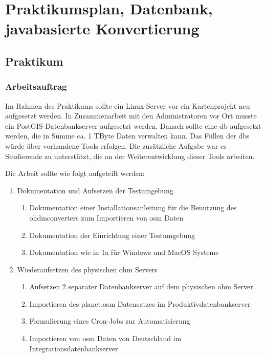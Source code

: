  \chead{} \ohead{\headmark}
\ifoot{\printTitle}  \ofoot{}
\part{Praktikumsplan, Datenbank, javabasierte Konvertierung}
\chapter{Praktikum}
\section{Arbeitsauftrag}
Im Rahmen des Praktikums sollte ein Linux-Server vor ein Kartenprojekt neu
aufgesetzt werden. In Zusammenarbeit mit den Administratoren vor Ort musste ein
PostGIS-Datenbankserver aufgesetzt werden. Danach sollte eine \gls{db} aufgesetzt werden, die in Summe ca. 1 TByte Daten verwalten kann. Das Füllen der \gls{db}s würde über vorhandene Tools erfolgen. Die zusätzliche Aufgabe war es Studierende zu unterstützt, die an der Weiterentwicklung dieser Tools arbeiten.

Die Arbeit sollte wie folgt aufgeteilt werden:
\begin{enumerate}
	\item Dokumentation und Aufsetzen der Testumgebung
	\begin{enumerate}
		\item Dokumentation einer Installationsanleitung für die Benutzung des \newline \gls{ohdmconverter}s zum Importieren von \gls{osm} Daten
		\item Dokumentation der Einrichtung einer Testumgebung
		\item Dokumentation wie in 1a für Windows und MacOS Systeme
	\end{enumerate}
	\item Wiederaufsetzen des physischen \gls{ohm} Servers
	\begin{enumerate}
		\item Aufsetzen 2 separater Datenbankserver auf dem physischen \gls{ohm} Server
		\item Importieren des planet.osm\cite{planet-osm} Datensatzes im Produktivdatenbankserver
		\item Formulierung eines Cron-Jobs zur Automatisierung
		\item Importieren von \gls{osm} Daten von Deutschland im Integrationsdatenbankserver
	\end{enumerate}
\end{enumerate}


